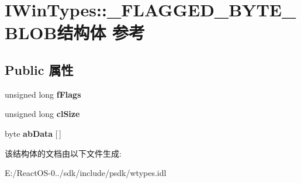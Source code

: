\hypertarget{struct_i_win_types_1_1___f_l_a_g_g_e_d___b_y_t_e___b_l_o_b}{}\section{I\+Win\+Types\+:\+:\+\_\+\+F\+L\+A\+G\+G\+E\+D\+\_\+\+B\+Y\+T\+E\+\_\+\+B\+L\+O\+B结构体 参考}
\label{struct_i_win_types_1_1___f_l_a_g_g_e_d___b_y_t_e___b_l_o_b}
\subsection*{Public 属性}
\begin{DoxyCompactItemize}
\item 
\mbox{\label{struct_i_win_types_1_1___f_l_a_g_g_e_d___b_y_t_e___b_l_o_b_afeb99f8e88482c79eaddb4bcb8dc6464}} 
unsigned long {\bfseries f\+Flags}
\item 
\mbox{\label{struct_i_win_types_1_1___f_l_a_g_g_e_d___b_y_t_e___b_l_o_b_aa0774fd5241734985bae754ef4eca5ae}} 
unsigned long {\bfseries cl\+Size}
\item 
\mbox{\label{struct_i_win_types_1_1___f_l_a_g_g_e_d___b_y_t_e___b_l_o_b_ac494c9146ec11c01a636d4158b415ed3}} 
byte {\bfseries ab\+Data} \mbox{[}$\,$\mbox{]}
\end{DoxyCompactItemize}


该结构体的文档由以下文件生成\+:\begin{DoxyCompactItemize}
\item 
E\+:/\+React\+O\+S-\/0../sdk/include/psdk/wtypes.\+idl\end{DoxyCompactItemize}
